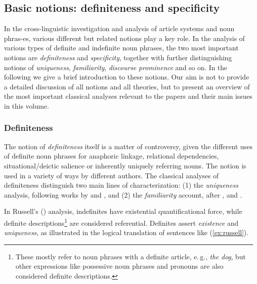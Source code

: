 \documentclass[output=paper]{langsci/langscibook}
\begin{document}
\subsection{Basic notions: definiteness and specificity}

{
In the cross-linguistic investigation and analysis of article systems and noun phras-es, various different but related notions play a key role. In the analysis of various types of definite and indefinite noun phrases, the two most important notions are {\emph{definiteness}} and {\emph{specificity}}, together with further distinguishing notions of {\emph{uniqueness}}, {\emph{familiarity}}, {\emph{discourse prominence}} and so on. In the following we give a brief introduction to these notions. 
Our aim is not to provide a detailed discussion of all notions and all theories, but to present an overview of the most important classical analyses relevant to the papers and their main issues in this volume. 
}

\subsubsection{Definiteness}

The notion of {\emph{definiteness}} itself is a matter of controversy, given the different uses of definite noun phrases for anaphoric linkage, relational dependencies, situational/deictic salience or inherently uniquely referring nouns. The notion is used in a variety of ways by different authors. The classical analyses of definiteness distinguish two main lines of characterization: (1) the {\emph{uniqueness}} analysis, following works by \citet{russell:05} and \citet{strawson:50}, and (2) the {\emph{familiarity}} account, after \citet{christophersen:39}, \citet{kamp:81} and \citet{heim:82}. 

{
In Russell's (\citeyear{russell:05}) analysis, indefinites have existential quantificational force, while definite descriptions\footnote{These mostly refer to noun phrases with a definite article, e.\,g., {\emph{the dog}}, but other expressions like possessive noun phrases and pronouns are also considered definite descriptions.} are considered referential. Definites assert {\emph{existence}} and {\emph{uniqueness}}, as illustrated in the logical translation of  sentences like (\ref{ex:russell}).
}
\end{document}
